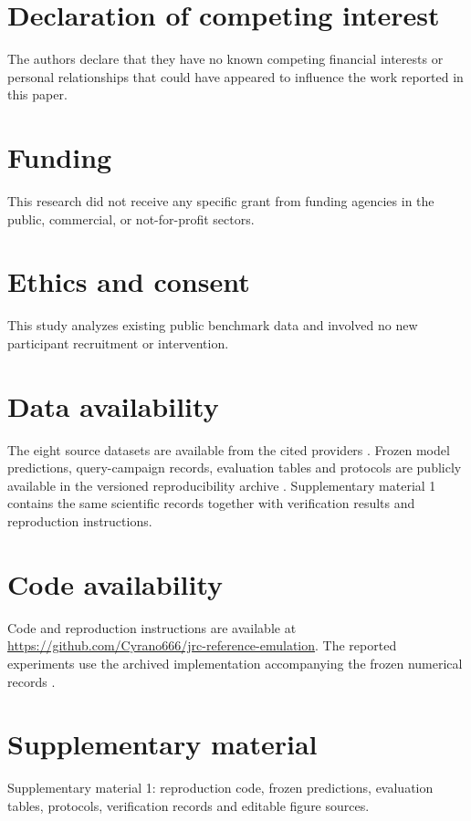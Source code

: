 \documentclass[preprint,12pt]{elsarticle}
\begin{document}
\section*{Declaration of competing interest}
The authors declare that they have no known competing financial interests or personal relationships that could have appeared to influence the work reported in this paper.

\section*{Funding}
This research did not receive any specific grant from funding agencies in the public, commercial, or not-for-profit sectors.

\section*{Ethics and consent}
This study analyzes existing public benchmark data and involved no new participant recruitment or intervention.

\section*{Data availability}
The eight source datasets are available from the cited providers \cite{har,dsads,mhealth,wisdm,pamap,realdisp,uschad,hhar}. Frozen model predictions, query-campaign records, evaluation tables and protocols are publicly available in the versioned reproducibility archive \cite{jrcdata}. Supplementary material 1 contains the same scientific records together with verification results and reproduction instructions.

\section*{Code availability}
Code and reproduction instructions are available at \url{https://github.com/Cyrano666/jrc-reference-emulation}. The reported experiments use the archived implementation accompanying the frozen numerical records \cite{jrcdata}.

\section*{Supplementary material}
Supplementary material 1: reproduction code, frozen predictions, evaluation tables, protocols, verification records and editable figure sources.



\end{document}
